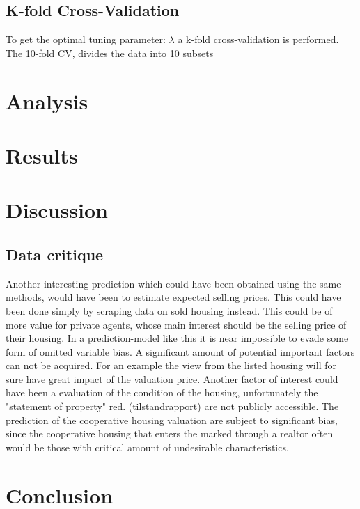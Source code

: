 \documentclass[12pt,a4paper]{article}
\begin{document}
\subsection{K-fold Cross-Validation}
To get the optimal tuning parameter: $\lambda$ a k-fold cross-validation is performed. The 10-fold CV, divides the data into 10 subsets  


\section{Analysis}

\section{Results}

\section{Discussion}

\subsection{Data critique}
Another interesting prediction which could have been obtained using the same methods, would have been to estimate expected selling prices. This could have been done simply by scraping data on sold housing instead. This could be of more value for private agents, whose main interest should be the selling price of their housing. 
\newline 
In a prediction-model like this it is near impossible to evade some form of omitted variable bias. A significant amount of potential important factors can not be acquired. For an example the view from the listed housing will for sure have great impact of the valuation price. Another factor of interest could have been a evaluation of the condition of the housing, unfortunately the "statement of property" red. (tilstandrapport) are not publicly accessible. \newline
The prediction of the cooperative housing valuation %
are subject to significant bias, since the cooperative housing that enters the marked through a realtor often would be those with critical amount of undesirable characteristics. 
\section{Conclusion}
\end{document}
